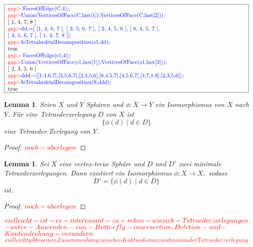 \documentclass[12pt,titlepage,twoside,cleardoublepage]{article}
\theoremstyle{nummermitklammern}
\newtheorem{lemma}[temp]{Lemma}
\newtheorem{lemma}[zahl]{Lemma}
\numberwithin{equation}{section}
\begin{document}
 $\fbox{
\parbox{15cm}{
\textcolor{red}{gap$>$} \textcolor{blue}{FacesOfEdge(C,4);;}\newline 
\textcolor{red}{gap$>$}\textcolor{blue}{Union(VerticesOfFace(C,last[1]),VerticesOfFace(C,last[2]));}
\newline
 [ 1, 4, 7, 8 ]\newline 
\textcolor{red}{gap$>$}\textcolor{blue}{dd:=[ [1, 4, 6, 7 ], [ 3, 5, 6, 7 ], [ 2, 4, 5, 6 ], [ 8, 4, 5, 7 ],$ \newline $ [ 4, 5, 6, 7 ], [ 1,
4, 7, 8 ]];}\newline 
\textcolor{red}{gap$>$}\textcolor{blue}{ IsTetrahedrialDecomposition(s1,dd);}\newline 
true\newline 
\textcolor{red}{gap$>$} \textcolor{blue}{FacesOfEdge(s1,4);;}\newline 
\textcolor{red}{gap$>$}\textcolor{blue}{Union(VerticesOfFace(s1,last[1]),VerticesOfFace(s1,last[2]));}
\newline [ 2, 3, 5, 6 ]\newline 
\textcolor{red}{gap$>$}\textcolor{blue}{ddd:=[[1,4,6,7],[3,5,6,7],[2,4,5,6],[8,4,5,7],[4,5,6,7],[4,7,1,8],[2,3,5,6]];;}\newline 
\textcolor{red}{gap$>$}\textcolor{blue}{IsTetrahedrialDecomposition(S,ddd);}\newline 
true
 }}$
\begin{lemma}
Seien $X$ und $Y$ Sphären und $\phi:X\to Y$ ein Isomorphismus von $X$ nach $Y$. Für eine Tetraederzerlegung $D$ von $X$ ist \[
\{\phi(d)\mid d\in D\}
\] eine Tetraeder Zerlegung von $Y$.
\end{lemma}
\begin{proof}
$\textcolor{red}{noch-uberlegen}$
\end{proof}
\begin{lemma}
Sei $X$ eine vertex-treue Sphäre und $D$ und $D'$ zwei minimale Tetraederzerlegungen. Dann existiert ein Isomorphismus $\phi:X\to X,$ sodass
\[
D'=\{\phi(d)\mid d\in D\}
\]
ist.
\end{lemma}
\begin{proof}
$\textcolor{red}{noch-uberlegen}$
\end{proof}
$
\textcolor{red}{vielleicht-ist-es-interessant-zu-sehen-wie sich-Tetraederzerlegungen}$
$\textcolor{red}{-unter-Anwenden-von-Butterfly-insersertion,Deletion-und-}$ 
$\textcolor{red}{Kantendrehung-verandern}
$
$\textcolor{red}{vielleicht gibt es einen Zusammenhang zwischen Kaktusdistanz und minimaler Tetraederzerlegung}$
\end{document}
